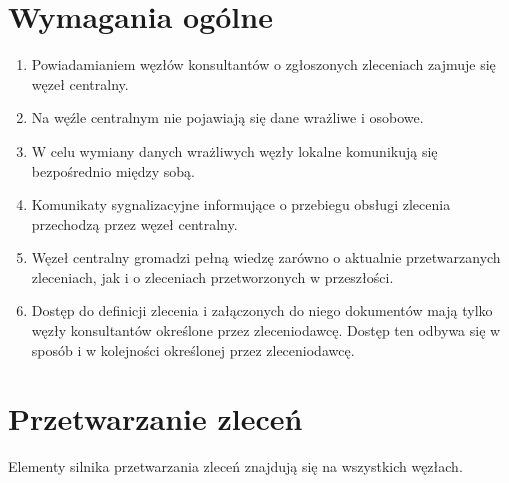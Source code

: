 \documentclass[a4paper]{report}
\begin{document}
\section{Wymagania ogólne}
\begin{enumerate}
\item Powiadamianiem węzłów konsultantów o zgłoszonych zleceniach zajmuje się węzeł centralny.
\item Na węźle centralnym nie pojawiają się dane wrażliwe i osobowe.
\item W celu wymiany danych wrażliwych węzły lokalne komunikują się bezpośrednio między sobą.
\item Komunikaty sygnalizacyjne informujące o przebiegu obsługi zlecenia przechodzą przez węzeł centralny.
\item Węzeł centralny gromadzi pełną wiedzę zarówno o aktualnie przetwarzanych zleceniach, jak i o zleceniach przetworzonych w przeszłości.
\item Dostęp do definicji zlecenia i załączonych do niego dokumentów mają tylko węzły konsultantów określone przez zleceniodawcę. Dostęp ten odbywa się w sposób i w kolejności określonej przez zleceniodawcę.
\end{enumerate}

\section{Przetwarzanie zleceń}

Elementy silnika przetwarzania zleceń znajdują się na wszystkich węzłach.
\end{document}
